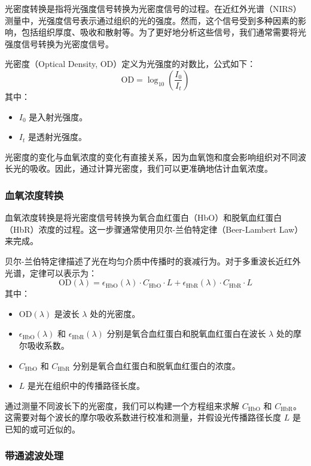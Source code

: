\documentclass[a4paper,12pt]{article}
\begin{document}
光密度转换是指将光强度信号转换为光密度信号的过程。在近红外光谱（NIRS）测量中，光强度信号表示通过组织的光的强度。然而，这个信号受到多种因素的影响，包括组织厚度、吸收和散射等。为了更好地分析这些信号，我们通常需要将光强度信号转换为光密度信号。

光密度（Optical Density, OD）定义为光强度的对数比，公式如下：
\[
\text{OD} = \log_{10} \left( \frac{I_0}{I_t} \right)
\]
其中：
\begin{itemize}
    \item \( I_0 \) 是入射光强度。
    \item \( I_t \) 是透射光强度。
\end{itemize}

光密度的变化与血氧浓度的变化有直接关系，因为血氧饱和度会影响组织对不同波长光的吸收。因此，通过计算光密度，我们可以更准确地估计血氧浓度。

\subsubsection{血氧浓度转换}

血氧浓度转换是将光密度信号转换为氧合血红蛋白（HbO）和脱氧血红蛋白（HbR）浓度的过程。这一步骤通常使用贝尔-兰伯特定律（Beer-Lambert Law）\cite{harris2015quantitative}来完成。

贝尔-兰伯特定律描述了光在均匀介质中传播时的衰减行为。对于多重波长近红外光谱，定律可以表示为：
\[
\text{OD}(\lambda) = \epsilon_{\text{HbO}}(\lambda) \cdot C_{\text{HbO}} \cdot L + \epsilon_{\text{HbR}}(\lambda) \cdot C_{\text{HbR}} \cdot L
\]
其中：
\begin{itemize}
    \item \(\text{OD}(\lambda)\) 是波长 \(\lambda\) 处的光密度。
    \item \(\epsilon_{\text{HbO}}(\lambda)\) 和 \(\epsilon_{\text{HbR}}(\lambda)\) 分别是氧合血红蛋白和脱氧血红蛋白在波长 \(\lambda\) 处的摩尔吸收系数。
    \item \(C_{\text{HbO}}\) 和 \(C_{\text{HbR}}\) 分别是氧合血红蛋白和脱氧血红蛋白的浓度。
    \item \(L\) 是光在组织中的传播路径长度。
\end{itemize}

通过测量不同波长下的光密度，我们可以构建一个方程组来求解 \(C_{\text{HbO}}\) 和 \(C_{\text{HbR}}\)。这需要对每个波长的摩尔吸收系数进行校准和测量，并假设光传播路径长度 \(L\) 是已知的或可近似的。

\subsubsection{带通滤波处理}
\end{document}
